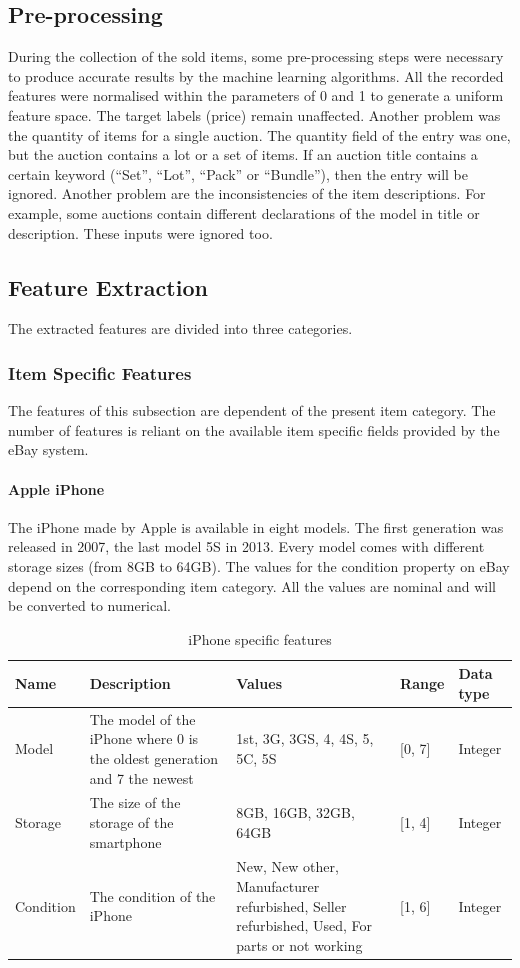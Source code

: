\subsection{Pre-processing}
During the collection of the sold items, some pre-processing steps were necessary to produce accurate results by the machine learning algorithms. All the recorded features were normalised within the parameters of 0 and 1 to generate a uniform feature space. The target labels (price) remain unaffected. 
Another problem was the quantity of items for a single auction. The quantity field of the entry was one, but the auction contains a lot or a set of items. If an auction title contains a certain keyword (``Set'', ``Lot'', ``Pack'' or ``Bundle''), then the entry will be ignored.
Another problem are the inconsistencies of the item descriptions. For example, some auctions contain different declarations of the model in title or description. These inputs were ignored too.
\subsection{Feature Extraction}
The extracted features are divided into three categories.
\subsubsection{Item Specific Features}
The features of this subsection are dependent of the present item category. The number of features is reliant on the available item specific fields provided by the eBay system.
\paragraph{Apple iPhone}
The iPhone made by Apple is available in eight models. The first generation was released in 2007, the last model 5S in 2013. Every model comes with different storage sizes (from 8GB to 64GB). The values for the condition property on eBay depend on the corresponding item category. All the values are nominal and will be converted to numerical.
\begin{table}[h!]
	\begin{center}
	\begin{tabular}{| p{2.6cm} | p{2.6cm} | p{2.6cm} | p{2.6cm} | p{2.6cm} |}
		\hline
		\textbf{Name} & \textbf{Description} & \textbf{Values} & \textbf{Range} & \textbf{Data type} \\
		\hline
		Model & The model of the iPhone where 0 is the oldest generation and 7 the newest & 1st, 3G, 3GS, 4, 4S, 5, 5C, 5S & [0, 7] & Integer \\
		\hline
		Storage & The size of the storage of the smartphone & 8GB, 16GB, 32GB, 64GB & [1, 4] & Integer \\
		\hline
		Condition & The condition of the iPhone & New, New other, Manufacturer refurbished, Seller refurbished, Used, For parts or not working & [1, 6] & Integer \\
		\hline
	\end{tabular}
	\end{center}
	\caption{iPhone specific features}
\end{table}

